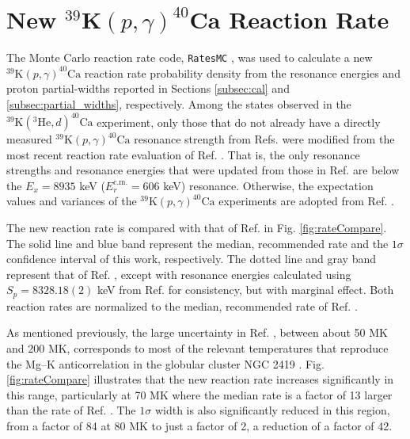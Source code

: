 \section{New $^{39}\mathrm{\textbf{K}}(p,\gamma)^{40}\mathrm{\textbf{Ca}}$ Reaction Rate}

The Monte Carlo reaction rate code, \texttt{RatesMC} \cite{Longland2010a,RatesMC}, was used to calculate a new $^{39}\mathrm{K}(p, \gamma)^{40}\mathrm{Ca}$ reaction rate probability density from the resonance energies and proton partial-widths reported in Sections \ref{subsec:cal} and \ref{subsec:partial_widths}, respectively. Among the states observed in the $^{39}\mathrm{K}(^{3}\mathrm{He},d)^{40}\mathrm{Ca}$ experiment, only those that do not already have a directly measured $^{39}\mathrm{K}(p, \gamma)^{40}\mathrm{Ca}$ resonance strength from Refs. \cite{Kikstra1990,Cheng1981,Leenhouts1966} were modified from the most recent reaction rate evaluation of Ref. \cite{Longland2018}. That is, the only resonance strengths and resonance energies that were updated from those in Ref. \cite{Longland2018} are below the $E_{x} = 8935$ keV ($E^{\mathrm{c.m.}}_{r} = 606$ keV) resonance. Otherwise, the expectation values and variances of the $^{39}\mathrm{K}(p, \gamma)^{40}\mathrm{Ca}$ experiments \cite{Kikstra1990,Cheng1981,Leenhouts1966} are adopted from Ref. \cite{Longland2018}.


The new reaction rate is compared with that of Ref. \cite{Longland2018} in Fig. \ref{fig:rateCompare}. The solid line and blue band represent the median, recommended rate and the $1\sigma$ confidence interval of this work, respectively. The dotted line and gray band represent that of Ref. \cite{Longland2018}, except with resonance energies calculated using $S_{p} = 8328.18(2)$ keV from Ref. \cite{Wang2021} for consistency, but with marginal effect. Both reaction rates are normalized to the median, recommended rate of Ref. \cite{Longland2018}. %

As mentioned previously, the large uncertainty in Ref. \cite{Longland2018}, between about 50 MK and 200 MK, corresponds to most of the relevant temperatures that reproduce the Mg--K anticorrelation in the globular cluster NGC 2419 \cite{Iliadis2016}. 
Fig. \ref{fig:rateCompare} illustrates that the new reaction rate increases significantly in this range, particularly at 70 MK where the median rate is a factor of 13 larger than the rate of Ref. \cite{Longland2018}. The $1\sigma$ width is also significantly reduced in this region, from a factor of 84 at 80 MK to just a factor of 2, a reduction of a factor of 42.

